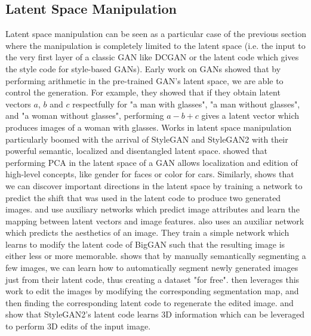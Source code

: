 \subsection{Latent Space Manipulation}\label{subsection:latent_space_manipulation}
Latent space manipulation can be seen as a particular case of the previous section where the manipulation 
is completely limited to the latent space (i.e. the input to the very first layer of a classic \ac{GAN}
like \ac{DCGAN} or the latent code which gives the style code for style-based \ac{GAN}s). 
Early work on \ac{GAN}s \citep{dcgan} showed that by performing arithmetic in the pre-trained 
\ac{GAN}'s latent space, we are able to control the generation. For example, they showed that
if they obtain latent vectors $a$, $b$ and $c$ respectfully for "a man with glasses", 
"a man without glasses", and "a woman without glasses", performing $a - b + c$ gives a latent 
vector which produces images of a woman with glasses. Works in latent space manipulation
 particularly boomed with the arrival of StyleGAN \citep{karra2019stylegan}
and StyleGAN2 \citep{karra2020stylegan2} with their powerful semantic, localized and 
disentangled latent space. \cite{harkonen2020ganspace} showed that performing PCA in the 
latent space of 
a \ac{GAN} allows localization and edition of high-level concepts, like gender for faces or 
color for cars. Similarly,
\cite{voynov20icml} shows that we can discover important directions in the latent space by 
training a network to predict the shift that was used in the latent code to produce two generated images. 
\cite{shen2020interfacegan} and \cite{zhuang2021enjoy} use auxiliary networks 
which predict image attributes and learn the mapping between latent vectors and image features.
\cite{Goetschalckxganalyze} also uses an auxiliar network which predicts the aesthetics of an 
image. They train a simple network which learns to modify the latent code of BigGAN \citep{brock2018large}
such that the resulting image is either less or more memorable.
 \cite{zhang2021datasetgan}
shows that by manually semantically segmenting a few images, we can learn how to automatically 
segment newly generated images just from their latent code, thus creating a dataset "for free".
 \cite{ling2021editgan} then leverages this work to edit 
the images by modifying the corresponding segmentation map, and then finding the corresponding latent code to regenerate 
the edited image. \cite{tewari2020stylerig} and \cite{zhang2020image} show that StyleGAN2's latent code 
learns 3D information which can be leveraged to perform 3D edits of the input image.

